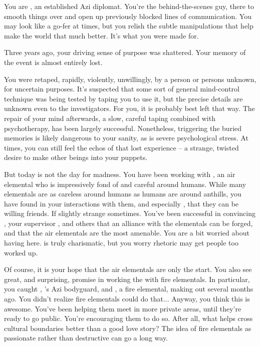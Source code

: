 \documentclass[char]{elementals}
\begin{document}
\name{\cDiplomat{}}

You are \cDiplomat{\intro}, an established Azi diplomat.  You're the behind-the-scenes guy, there to smooth things over and open up previously blocked lines of communication.  You may look like a go-fer at times, but you relish the subtle manipulations that help make the world that much better.  It's what you were made for.

Three years ago, your driving sense of purpose was shattered.  Your memory of the event is almost entirely lost.

You were retaped, rapidly, violently, unwillingly, by a person or persons unknown, for uncertain purposes.  It's suspected that some sort of general mind-control technique was being tested by taping you to use it, but the precise details are unknown even to the investigators.  For you, it is probably best left that way.  The repair of your mind afterwards, a slow, careful taping combined with psychotherapy, has been largely successful.  Nonetheless, triggering the buried memories is likely dangerous to your sanity, as is severe psychological stress.  At times, you can still feel the echos of that lost experience -- a strange, twisted desire to make other beings into your puppets.

But today is not the day for madness.  You have been working with \cNaturalist{}, an air elemental who is impressively fond of and careful around humans.  While many elementals are as careless around humans as humans are around anthills, you have found in your interactions with them, and especially \cNaturalist{}, that they can be willing friends.  If slightly strange sometimes.  You've been successful in convincing \cLeader{}, your supervisor \cAvatar{}, and others that an alliance with the elementals can be forged, and that the air elementals are the most amenable.  You are a bit worried about having \cDema{} here.  \cDema{\They} is truly charismatic, but you worry \cDema{\their} rhetoric may get people too worked up.

Of course, it is your hope that the air elementals are only the start.  You also see great, and surprising, promise in working the with fire elementals.  In particular, you caught \cRomeo{}, \cLeader{}'s Azi bodyguard, and \cJuliet{}, a fire elemental, making out several months ago.  You didn't realize fire elementals could do that...  Anyway, you think this is awesome.  You've been helping them meet in more private areas, until they're ready to go public.  You're encouraging them to do so.  After all, what helps cross cultural boundaries better than a good love story?  The idea of fire elementals as passionate rather than destructive can go a long way.
\end{document}
